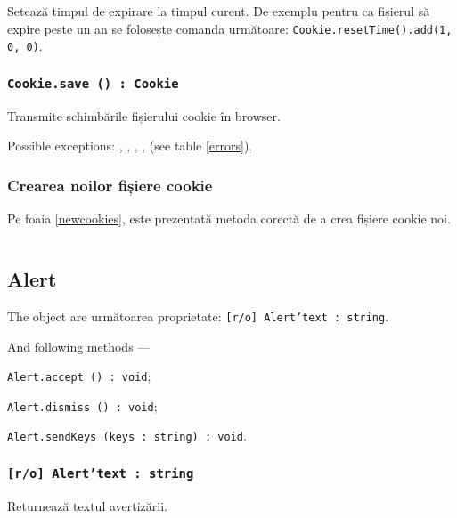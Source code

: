 Setează timpul de expirare la timpul curent. De exemplu pentru ca fișierul să expire peste un an se folosește comanda următoare: \texttt{Cookie.resetTime().add(1, 0, 0)}.

\subsubsection{\texttt{Cookie.save () : Cookie}}

Transmite schimbările fișierului cookie în browser.

Possible exceptions: , , , ,  (see table \ref{errors}).

\subsubsection{Crearea noilor fișiere cookie}

Pe foaia \ref{newcookies}, este prezentată metoda corectă de a crea fișiere cookie noi.

\begin{sourcecode}
    \label{newcookies}
    \inputminted[linenos]{icl}{../sources/newcookies.icL}
\end{sourcecode}


\subsection{{\color{orange} Alert}}

The object \alert{} are următoarea proprietate: \texttt{[r/o] Alert'text : string}.

And following methods —
\begin{icItems}
	\item \texttt{Alert.accept () : void};
	\item \texttt{Alert.dismiss () : void};
	\item \texttt{Alert.sendKeys (keys : string) : void}.
\end{icItems}

\subsubsection{\texttt{[r/o] Alert'text : string}}

Returnează textul avertizării.

